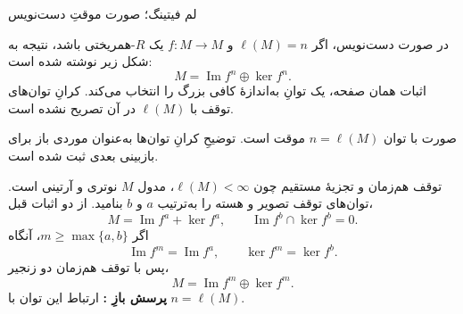 \begin{frame}[t]{لم فیتینگ؛ صورت موقتِ دست‌نویس}
  \label{lec13:fitting-statement}
  \begin{question}
    در صورت دست‌نویس، اگر $\ell(M)=n$ و $f:M\to M$ یک $R$-همریختی باشد،
    نتیجه به شکل زیر نوشته شده است:
    \[
      M=\operatorname{Im}f^n\oplus\ker f^n.
    \]
    اثبات همان صفحه، یک توانِ به‌اندازهٔ کافی بزرگ را انتخاب می‌کند.
    کرانِ توان‌های توقف با $\ell(M)$ در آن تصریح نشده است.
    \par\medskip
    صورت با توان $n=\ell(M)$ موقت است. توضیحِ کرانِ توان‌ها به‌عنوان
    موردی باز برای بازبینی بعدی ثبت شده است.
  \end{question}
\end{frame}

\begin{frame}[t]{توقف هم‌زمان و تجزیهٔ مستقیم}
  \label{lec13:fitting-stabilization}
  چون $\ell(M)<\infty$، مدول $M$ نوتری و آرتینی است.
  توان‌های توقف تصویر و هسته را به‌ترتیب $a$ و $b$ بنامید.
  از دو اثبات قبل،
  \[
    M=\operatorname{Im}f^a+\ker f^a,
    \qquad
    \operatorname{Im}f^b\cap\ker f^b=0.
  \]
  اگر $m\geqslant\max\{a,b\}$، آنگاه
  \[
    \operatorname{Im}f^m=\operatorname{Im}f^a,
    \qquad
    \ker f^m=\ker f^b.
  \]
  پس با توقف هم‌زمان دو زنجیر،
  \[
    M=\operatorname{Im}f^m\oplus\ker f^m.
  \]
  \textbf{پرسش بازِ :} ارتباط این توان با $n=\ell(M)$.
\end{frame}
